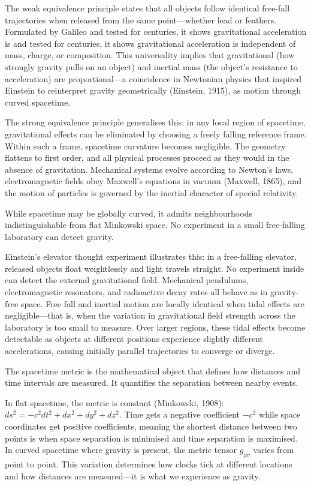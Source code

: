 
The weak equivalence principle states that all objects follow identical free-fall trajectories when released from the same point—whether lead or feathers. Formulated by Galileo and tested for centuries, it shows gravitational acceleration is and tested for centuries, it shows gravitational acceleration is independent of mass, charge, or composition. This universality implies that gravitational (how strongly gravity pulls on an object) and inertial mass (the object's resistance to acceleration) are proportional—a coincidence in Newtonian physics that inspired Einstein to reinterpret gravity geometrically (Einstein, 1915), as motion through curved spacetime.

The strong equivalence principle generalises this: in any local region of spacetime, gravitational effects can be eliminated by choosing a freely falling reference frame. Within such a frame, spacetime curvature becomes negligible. The geometry flattens to first order, and all physical processes proceed as they would in the absence of gravitation. Mechanical systems evolve according to Newton's laws, electromagnetic fields obey Maxwell's equations in vacuum (Maxwell, 1865), and the motion of particles is governed by the inertial character of special relativity.

While spacetime may be globally curved, it admits neighbourhoods indistinguishable from flat Minkowski space. No experiment in a small free-falling laboratory can detect gravity.

Einstein's elevator thought experiment illustrates this: in a free-falling elevator, released objects float weightlessly and light travels straight. No experiment inside can detect the external gravitational field. Mechanical pendulums, electromagnetic resonators, and radioactive decay rates all behave as in gravity-free space. Free fall and inertial motion are locally identical when tidal effects are negligible—that is, when the variation in gravitational field strength across the laboratory is too small to measure. Over larger regions, these tidal effects become detectable as objects at different positions experience slightly different accelerations, causing initially parallel trajectories to converge or diverge.

The spacetime metric is the mathematical object that defines how distances and time intervals are measured. It quantifies the separation between nearby events.

In flat spacetime, the metric is constant (Minkowski, 1908): \(ds^2 = -c^2 dt^2 + dx^2 + dy^2 + dz^2\). Time gets a negative coefficient \(-c^2\) while space coordinates get positive coefficients, meaning the shortest distance between two points is when space separation is minimised and time separation is maximised. In curved spacetime where gravity is present, the metric tensor \(g_{\mu\nu}\) varies from point to point. This variation determines how clocks tick at different locations and how distances are measured—it is what we experience as gravity.


